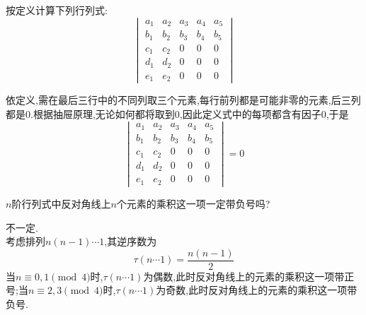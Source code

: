 \documentclass{ctexart}
\begin{document}
\begin{homework}[3]
    按定义计算下列行列式:
    \[\begin{vmatrix}
        a_1&a_2&a_3&a_4&a_5\\
        b_1&b_2&b_3&b_4&b_5\\
        c_1&c_2&0&0&0\\
        d_1&d_2&0&0&0\\
        e_1&e_2&0&0&0
    \end{vmatrix}\]
\end{homework}
\begin{solution}
    依定义,需在最后三行中的不同列取三个元素,每行前列都是可能非零的元素,后三列都是$0$.根据抽屉原理,无论如何都将取到$0$,因此定义式中的每项都含有因子$0$,于是
    \[\begin{vmatrix}
        a_1&a_2&a_3&a_4&a_5\\
        b_1&b_2&b_3&b_4&b_5\\
        c_1&c_2&0&0&0\\
        d_1&d_2&0&0&0\\
        e_1&e_2&0&0&0
    \end{vmatrix}=0\]
\end{solution}
\begin{homework}[4]
    $n$阶行列式中反对角线上$n$个元素的乘积这一项一定带负号吗?
\end{homework}
\begin{solution}
    不一定.\\
    考虑排列$n(n-1)\cdots1$,其逆序数为
    \[\tau\left(n\cdots 1\right)=\dfrac{n(n-1)}{2}\]
    当$n\equiv0,1\pmod{4}$时,$\tau\left(n\cdots 1\right)$为偶数,此时反对角线上的元素的乘积这一项带正号;当$n\equiv2,3\pmod{4}$时,$\tau\left(n\cdots 1\right)$为奇数,此时反对角线上的元素的乘积这一项带负号.
\end{solution}
\end{document}
